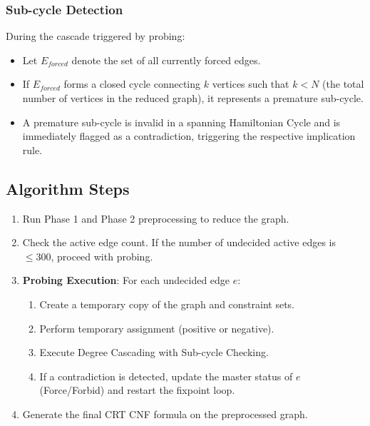 \subsubsection{Sub-cycle Detection}
During the cascade triggered by probing:
\begin{itemize}
    \item Let $E_{forced}$ denote the set of all currently forced edges.
    \item If $E_{forced}$ forms a closed cycle connecting $k$ vertices such that $k < N$ (the total number of vertices in the reduced graph), it represents a premature sub-cycle.
    \item A premature sub-cycle is invalid in a spanning Hamiltonian Cycle and is immediately flagged as a contradiction, triggering the respective implication rule.
\end{itemize}

\subsection{Algorithm Steps}
\begin{enumerate}
    \item Run Phase 1 and Phase 2 preprocessing to reduce the graph.
    \item Check the active edge count. If the number of undecided active edges is $\le 300$, proceed with probing.
    \item \textbf{Probing Execution}:
    For each undecided edge $e$:
    \begin{enumerate}
        \item Create a temporary copy of the graph and constraint sets.
        \item Perform temporary assignment (positive or negative).
        \item Execute Degree Cascading with Sub-cycle Checking.
        \item If a contradiction is detected, update the master status of $e$ (Force/Forbid) and restart the fixpoint loop.
    \end{enumerate}
    \item Generate the final CRT CNF formula on the preprocessed graph.
\end{enumerate}

